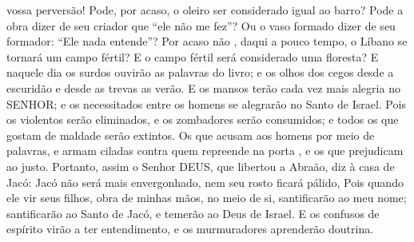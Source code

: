 {   vossa perversão! Pode, por acaso, o oleiro ser considerado igual ao barro? Pode a obra dizer de seu criador que “ele não me fez”? Ou o vaso formado dizer de seu formador: “Ele nada entende”?
  Por acaso não
{}, daqui a pouco tempo, o Líbano se tornará um campo fértil? E o campo fértil será considerado uma floresta?
  E naquele dia os surdos ouvirão as palavras do livro; e os olhos dos cegos desde a escuridão e desde as trevas as verão.
  E os mansos terão cada vez mais alegria no SENHOR; e os necessitados entre os homens se alegrarão no Santo de Israel.
  Pois os violentos serão eliminados, e os zombadores serão consumidos; e todos os que gostam de maldade serão extintos.
  Os que acusam aos homens por meio de palavras, e armam ciladas contra quem
{} repreende na porta
{}, e os que prejudicam ao justo.
  Portanto, assim o Senhor DEUS, que libertou a Abraão, diz à casa de Jacó: Jacó não será mais envergonhado, nem seu rosto ficará pálido,
  Pois quando ele vir seus filhos, obra de minhas mãos, no meio de si,
{} santificarão ao meu nome; santificarão ao Santo de Jacó, e temerão ao Deus de Israel.
  E os confusos
 de espírito virão a ter entendimento, e os murmuradores aprenderão doutrina.
\par }

